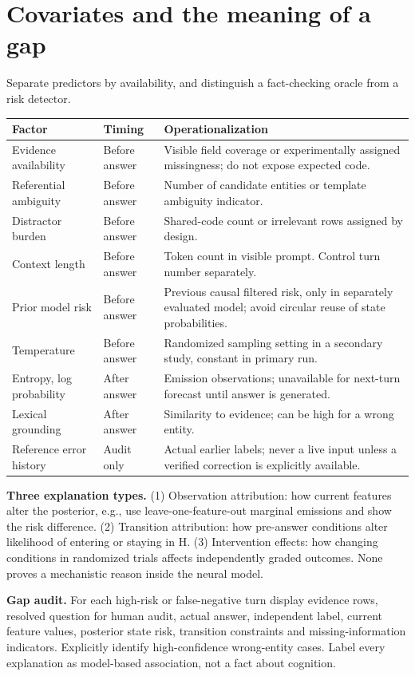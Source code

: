 \documentclass[11pt,letterpaper]{article}
\newcommand{\sectionpage}[1]{\clearpage\section{#1}}
\begin{document}
\sectionpage{Covariates and the meaning of a gap}
Separate predictors by availability, and distinguish a fact-checking oracle from a risk detector.

\begin{tabularx}{\linewidth}{p{.24\linewidth}p{.19\linewidth}X}
\toprule Factor & Timing & Operationalization \\ \midrule
Evidence availability & Before answer & Visible field coverage or experimentally assigned missingness; do not expose expected code. \\
Referential ambiguity & Before answer & Number of candidate entities or template ambiguity indicator. \\
Distractor burden & Before answer & Shared-code count or irrelevant rows assigned by design. \\
Context length & Before answer & Token count in visible prompt. Control turn number separately. \\
Prior model risk & Before answer & Previous causal filtered risk, only in separately evaluated model; avoid circular reuse of state probabilities. \\
Temperature & Before answer & Randomized sampling setting in a secondary study, constant in primary run. \\
Entropy, log probability & After answer & Emission observations; unavailable for next-turn forecast until answer is generated. \\
Lexical grounding & After answer & Similarity to evidence; can be high for a wrong entity. \\
Reference error history & Audit only & Actual earlier labels; never a live input unless a verified correction is explicitly available. \\ \bottomrule
\end{tabularx}

\textbf{Three explanation types.} (1) Observation attribution: how current features alter the posterior, e.g., use leave-one-feature-out marginal emissions and show the risk difference. (2) Transition attribution: how pre-answer conditions alter likelihood of entering or staying in H. (3) Intervention effects: how changing conditions in randomized trials affects independently graded outcomes. None proves a mechanistic reason inside the neural model.

\textbf{Gap audit.} For each high-risk or false-negative turn display evidence rows, resolved question for human audit, actual answer, independent label, current feature values, posterior state risk, transition constraints and missing-information indicators. Explicitly identify high-confidence wrong-entity cases. Label every explanation as model-based association, not a fact about cognition.
\end{document}
